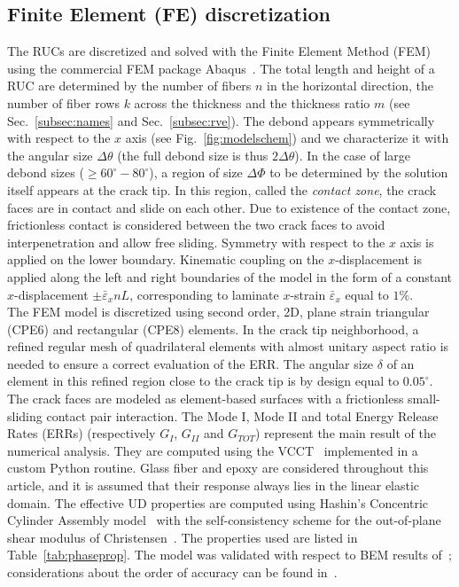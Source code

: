 \documentclass[review]{elsarticle}
\begin{document}

\subsection{Finite Element (FE) discretization}

The RUCs are discretized and solved with the Finite Element Method (FEM) using the commercial FEM package Abaqus~\cite{abq12}. The total length and height of a RUC are determined by the number of fibers $n$ in the horizontal direction, the number of fiber rows $k$ across the thickness and the thickness ratio $m$ (see Sec.~\ref{subsec:names} and Sec.~\ref{subsec:rve}). The debond appears symmetrically with respect to the $x$ axis (see Fig.~\ref{fig:modelschem}) and we characterize it with the angular size $\Delta\theta$ (the full debond size is thus $2\Delta\theta$). In the case of large debond sizes ($\geq 60^{\circ}-80^{\circ}$), a region of size $\Delta\Phi$ to be determined by the solution itself appears at the crack tip. In this region, called the \emph{contact zone}, the crack faces are in contact and slide on each other. Due to existence of the contact zone, frictionless contact is considered between the two crack faces to avoid interpenetration and allow free sliding. Symmetry with respect to the $x$ axis is applied on the lower boundary. Kinematic coupling on the $x$-displacement is applied along the left and right boundaries of the model in the form of a constant $x$-displacement $\pm\bar{\varepsilon}_{x} nL$, corresponding to laminate $x$-strain $\bar{\varepsilon}_{x}$ equal to $1\%$.\\
The FEM model is discretized using second order, 2D, plane strain triangular (CPE6) and rectangular (CPE8) elements. In the crack tip neighborhood, a refined regular mesh of quadrilateral elements with almost unitary aspect ratio is needed to ensure a correct evaluation of the ERR. The angular size $\delta$ of an element in this refined region close to the crack tip is by design equal to $0.05^{\circ}$. The crack faces are modeled as element-based surfaces with a frictionless small-sliding contact pair interaction. The Mode I, Mode II and total Energy Release Rates (ERRs) (respectively $G_{I}$, $G_{II}$ and $G_{TOT}$) represent the main result of the numerical analysis. They are computed using the VCCT~\cite{Krueger2004} implemented in a custom Python routine. Glass fiber and epoxy are considered throughout this article, and it is assumed that their response always lies in the linear elastic domain. The effective UD properties are computed using Hashin's Concentric Cylinder Assembly model~\cite{Hashin1983} with the self-consistency scheme for the out-of-plane shear modulus of Christensen~\cite{Christensen1979}. The properties used are listed in Table~\ref{tab:phaseprop}. The model was validated with respect to BEM results of~\cite{Paris2007,Sandino2016}; considerations about the order of accuracy can be found in~\cite{DiStasio2019}.
\end{document}
